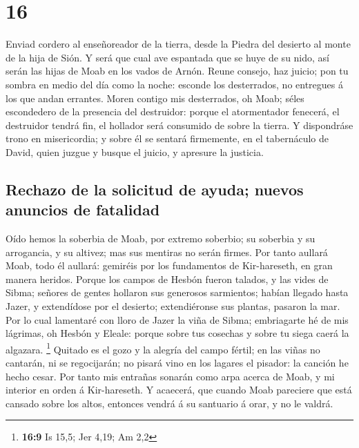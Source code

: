 \hypertarget{section-15}{%
\section{16}\label{section-15}}

 Enviad cordero al enseñoreador de la tierra, desde la
Piedra del desierto al monte de la hija de Sión.  Y será
que cual ave espantada que se huye de su nido, así serán las hijas de
Moab en los vados de Arnón.  Reune consejo, haz juicio;
pon tu sombra en medio del día como la noche: esconde los desterrados,
no entregues á los que andan errantes.  Moren contigo mis
desterrados, oh Moab; séles escondedero de la presencia del destruidor:
porque el atormentador fenecerá, el destruidor tendrá fin, el hollador
será consumido de sobre la tierra.  Y dispondráse trono en
misericordia; y sobre él se sentará firmemente, en el tabernáculo de
David, quien juzgue y busque el juicio, y apresure la justicia.

\hypertarget{rechazo-de-la-solicitud-de-ayuda-nuevos-anuncios-de-fatalidad}{%
\subsection{Rechazo de la solicitud de ayuda; nuevos anuncios de
fatalidad}\label{rechazo-de-la-solicitud-de-ayuda-nuevos-anuncios-de-fatalidad}}

 Oído hemos la soberbia de Moab, por extremo soberbio; su
soberbia y su arrogancia, y su altivez; mas sus mentiras no serán
firmes.  Por tanto aullará Moab, todo él aullará: gemiréis
por los fundamentos de Kir-hareseth, en gran manera heridos.
 Porque los campos de Hesbón fueron talados, y las vides
de Sibma; señores de gentes hollaron sus generosos sarmientos; habían
llegado hasta Jazer, y extendídose por el desierto; extendiéronse sus
plantas, pasaron la mar.  Por lo cual lamentaré con lloro
de Jazer la viña de Sibma; embriagarte hé de mis lágrimas, oh Hesbón y
Eleale: porque sobre tus cosechas y sobre tu siega caerá la algazara.
\footnote{\textbf{16:9} Is 15,5; Jer 4,19; Am 2,2} 
Quitado es el gozo y la alegría del campo fértil; en las viñas no
cantarán, ni se regocijarán; no pisará vino en los lagares el pisador:
la canción he hecho cesar.  Por tanto mis entrañas
sonarán como arpa acerca de Moab, y mi interior en orden á Kir-hareseth.
 Y acaecerá, que cuando Moab pareciere que está cansado
sobre los altos, entonces vendrá á su santuario á orar, y no le valdrá.

